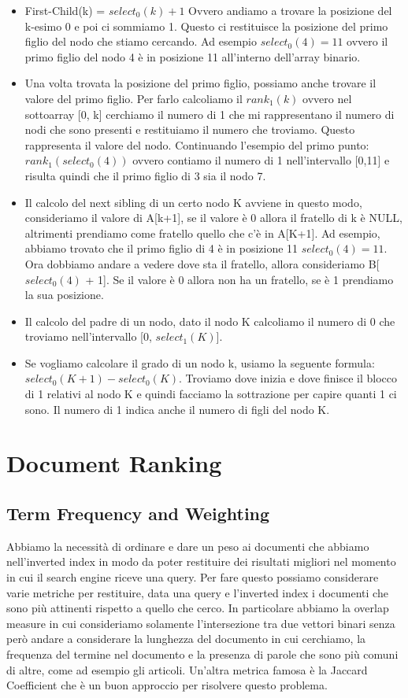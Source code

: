 \documentclass[14pt]{extreport}
\begin{document}
\begin{itemize}
    \item First-Child(k) = $select_0(k)+1$ Ovvero andiamo a trovare la posizione del k-esimo 0 e poi ci sommiamo 1. Questo ci restituisce la posizione del primo figlio del nodo che stiamo cercando.
    Ad esempio $select_0(4) = 11$ ovvero il primo figlio del nodo 4 è in posizione 11 all'interno dell'array binario.
    \item Una volta trovata la posizione del primo figlio, possiamo anche trovare il valore del primo figlio. Per farlo calcoliamo il $rank_1(k)$ ovvero nel sottoarray [0, k] cerchiamo il numero di 1 che mi rappresentano il numero di nodi che sono presenti e restituiamo il numero che troviamo. Questo rappresenta il valore del nodo.
    Continuando l'esempio del primo punto: $rank_1(select_0(4))$ ovvero contiamo il numero di 1 nell'intervallo [0,11] e risulta quindi che il primo figlio di 3 sia il nodo 7.
    \item Il calcolo del next sibling di un certo nodo K avviene in questo modo, consideriamo il valore di A[k+1], se il valore è 0 allora il fratello di k è NULL, altrimenti prendiamo come fratello quello che c'è in A[K+1].
    Ad esempio, abbiamo trovato che il primo figlio di 4 è in posizione 11 $select_0(4) = 11$. Ora dobbiamo andare a vedere dove sta il fratello, allora consideriamo B[$select_0(4)$ + 1]. Se il valore è 0 allora non ha un fratello, se è 1 prendiamo la sua posizione.
    \item Il calcolo del padre di un nodo, dato il nodo K calcoliamo il numero di 0 che troviamo nell'intervallo [0, $select_1(K)$].
    \item Se vogliamo calcolare il grado di un nodo k, usiamo la seguente formula: $select_0(K+1) - select_0(K)$. Troviamo dove inizia e dove finisce il blocco di 1 relativi al nodo K e quindi facciamo la sottrazione per capire quanti 1 ci sono. Il numero di 1 indica anche il numero di figli del nodo K.
\end{itemize}

\chapter{Document Ranking}

\section{Term Frequency and Weighting}

Abbiamo la necessità di ordinare e dare un peso ai documenti che abbiamo nell'inverted index in modo da poter restituire dei risultati migliori nel momento in cui il search engine riceve una query.
Per fare questo possiamo considerare varie metriche per restituire, data una query e l'inverted index i documenti che sono più attinenti rispetto a quello che cerco.
In particolare abbiamo la overlap measure in cui consideriamo solamente l'intersezione tra due vettori binari senza però andare a considerare la lunghezza del documento in cui cerchiamo, la frequenza del termine nel documento e la presenza di parole che sono più comuni di altre, come ad esempio gli articoli. 
Un'altra metrica famosa è la Jaccard Coefficient che è un buon approccio per risolvere questo problema.
\end{document}
